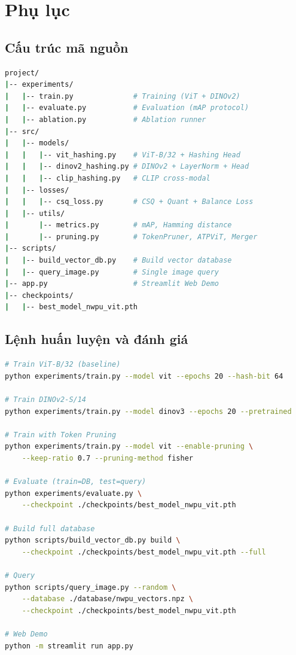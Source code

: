 \documentclass[13pt,a4paper]{article}
\begin{document}
\section{Phụ lục}

\subsection{Cấu trúc mã nguồn}

\begin{lstlisting}[language=bash, caption={Cấu trúc thư mục dự án}]
project/
|-- experiments/
|   |-- train.py              # Training (ViT + DINOv2)
|   |-- evaluate.py           # Evaluation (mAP protocol)
|   |-- ablation.py           # Ablation runner
|-- src/
|   |-- models/
|   |   |-- vit_hashing.py    # ViT-B/32 + Hashing Head
|   |   |-- dinov2_hashing.py # DINOv2 + LayerNorm + Head
|   |   |-- clip_hashing.py   # CLIP cross-modal
|   |-- losses/
|   |   |-- csq_loss.py       # CSQ + Quant + Balance Loss
|   |-- utils/
|       |-- metrics.py        # mAP, Hamming distance
|       |-- pruning.py        # TokenPruner, ATPViT, Merger
|-- scripts/
|   |-- build_vector_db.py    # Build vector database
|   |-- query_image.py        # Single image query
|-- app.py                    # Streamlit Web Demo
|-- checkpoints/
|   |-- best_model_nwpu_vit.pth
\end{lstlisting}


\subsection{Lệnh huấn luyện và đánh giá}

\begin{lstlisting}[language=bash, caption={Các lệnh chính}]
# Train ViT-B/32 (baseline)
python experiments/train.py --model vit --epochs 20 --hash-bit 64

# Train DINOv2-S/14
python experiments/train.py --model dinov3 --epochs 20 --pretrained

# Train with Token Pruning
python experiments/train.py --model vit --enable-pruning \
    --keep-ratio 0.7 --pruning-method fisher

# Evaluate (train=DB, test=query)
python experiments/evaluate.py \
    --checkpoint ./checkpoints/best_model_nwpu_vit.pth

# Build full database
python scripts/build_vector_db.py build \
    --checkpoint ./checkpoints/best_model_nwpu_vit.pth --full

# Query
python scripts/query_image.py --random \
    --database ./database/nwpu_vectors.npz \
    --checkpoint ./checkpoints/best_model_nwpu_vit.pth

# Web Demo
python -m streamlit run app.py
\end{lstlisting}
\end{document}
